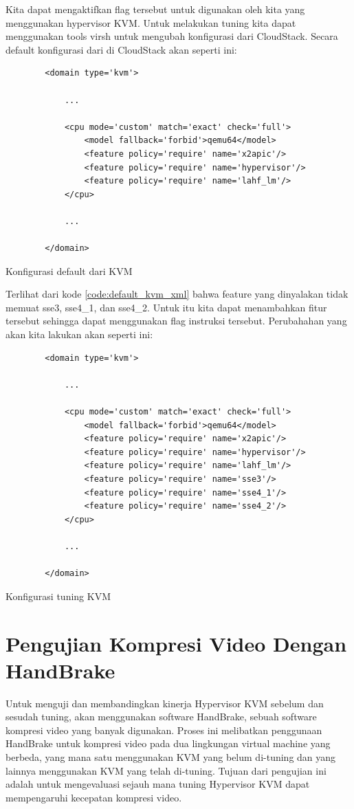 Kita dapat mengaktifkan flag tersebut untuk digunakan oleh \vmm kita yang menggunakan hypervisor KVM. Untuk melakukan tuning kita dapat menggunakan tools virsh untuk mengubah konfigurasi \vm dari CloudStack. Secara default konfigurasi dari \vm di CloudStack akan seperti ini:


\begin{listing}[H]
	\begin{verbatim}
		<domain type='kvm'>
		
			...
			
			<cpu mode='custom' match='exact' check='full'>
				<model fallback='forbid'>qemu64</model>
				<feature policy='require' name='x2apic'/>
				<feature policy='require' name='hypervisor'/>
				<feature policy='require' name='lahf_lm'/>
			</cpu>
			
			...
			
		</domain>
	\end{verbatim}
	\caption{Konfigurasi default dari KVM}
	\label{code:default_kvm_xml}
\end{listing}

Terlihat dari kode \ref{code:default_kvm_xml} bahwa feature yang dinyalakan tidak memuat sse3, sse4\_1, dan sse4\_2. Untuk itu kita dapat menambahkan fitur tersebut sehingga \vm dapat menggunakan flag instruksi tersebut. Perubahahan yang akan kita lakukan akan seperti ini:

\begin{listing}[H]
	\begin{verbatim}
		<domain type='kvm'>
		
			...
			
			<cpu mode='custom' match='exact' check='full'>
				<model fallback='forbid'>qemu64</model>
				<feature policy='require' name='x2apic'/>
				<feature policy='require' name='hypervisor'/>
				<feature policy='require' name='lahf_lm'/>
				<feature policy='require' name='sse3'/>
				<feature policy='require' name='sse4_1'/>
				<feature policy='require' name='sse4_2'/>
			</cpu>
			
			...
			
		</domain>
	\end{verbatim}
	\caption{Konfigurasi tuning KVM}
	\label{code:tuned_kvm_xml}
\end{listing}

\section{Pengujian Kompresi Video Dengan HandBrake}
Untuk menguji dan membandingkan kinerja Hypervisor KVM sebelum dan sesudah tuning, \saya akan menggunakan software HandBrake, sebuah software kompresi video yang banyak digunakan. Proses ini melibatkan penggunaan HandBrake untuk kompresi video pada dua lingkungan virtual machine yang berbeda, yang mana satu menggunakan KVM yang belum di-tuning dan yang lainnya menggunakan KVM yang telah di-tuning. Tujuan dari pengujian ini adalah untuk mengevaluasi sejauh mana tuning Hypervisor KVM dapat mempengaruhi kecepatan kompresi video.

